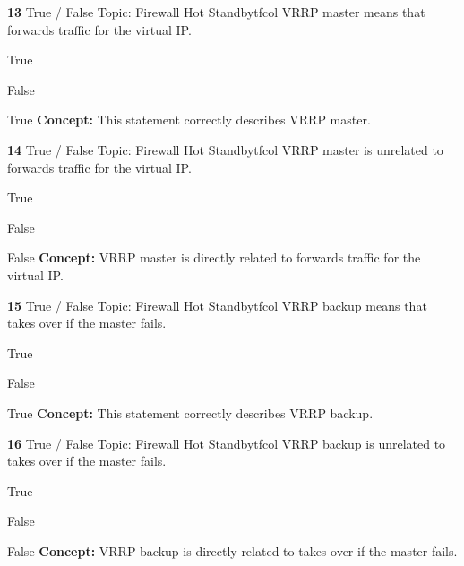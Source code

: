\documentclass[10pt,a4paper]{article}
\begin{document}
\begin{qcard}{\color{white}\textbf{13} \hfill \small True / False \textbar{} Topic: Firewall Hot Standby}{tfcol}
VRRP master means that forwards traffic for the virtual IP.

\begin{qoptions}
\item True
\item False
\end{qoptions}
\begin{explainbox}{True}
\textbf{Concept:} This statement correctly describes VRRP master.
\end{explainbox}
\end{qcard}

\begin{qcard}{\color{white}\textbf{14} \hfill \small True / False \textbar{} Topic: Firewall Hot Standby}{tfcol}
VRRP master is unrelated to forwards traffic for the virtual IP.

\begin{qoptions}
\item True
\item False
\end{qoptions}
\begin{explainbox}{False}
\textbf{Concept:} VRRP master is directly related to forwards traffic for the virtual IP.
\end{explainbox}
\end{qcard}

\begin{qcard}{\color{white}\textbf{15} \hfill \small True / False \textbar{} Topic: Firewall Hot Standby}{tfcol}
VRRP backup means that takes over if the master fails.

\begin{qoptions}
\item True
\item False
\end{qoptions}
\begin{explainbox}{True}
\textbf{Concept:} This statement correctly describes VRRP backup.
\end{explainbox}
\end{qcard}

\begin{qcard}{\color{white}\textbf{16} \hfill \small True / False \textbar{} Topic: Firewall Hot Standby}{tfcol}
VRRP backup is unrelated to takes over if the master fails.

\begin{qoptions}
\item True
\item False
\end{qoptions}
\begin{explainbox}{False}
\textbf{Concept:} VRRP backup is directly related to takes over if the master fails.
\end{explainbox}
\end{qcard}
\end{document}
